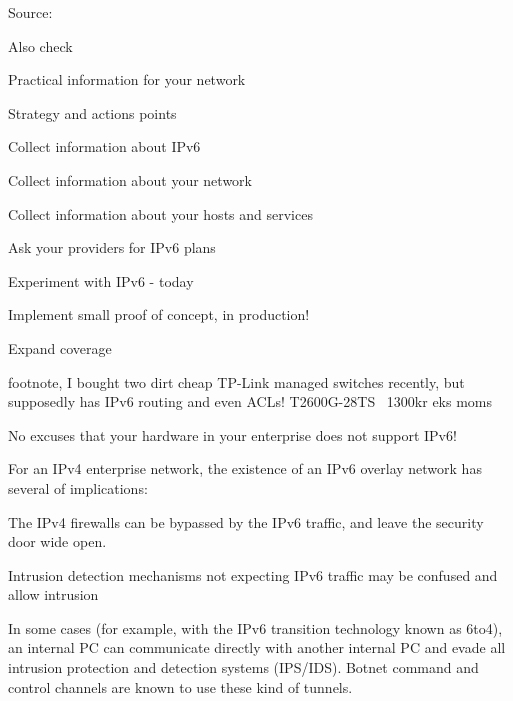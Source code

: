 \documentclass[20pt,landscape,a4paper,footrule]{foils}
\begin{document}

Source: 

Also check 

\centerline{}




Practical information for your network

\begin{list1}
\item Strategy and actions points
\begin{list2}
\item Collect information about IPv6
\item Collect information about your network
\item Collect information about your hosts and services
\item Ask your providers for IPv6 plans
\item Experiment with IPv6 - today
\item Implement small proof of concept, in production!
\item Expand coverage
\end{list2}
\end{list1}

footnote, I bought two dirt cheap TP-Link managed switches recently, but supposedly has IPv6 routing and even ACLs! T2600G-28TS ~1300kr eks moms\\ {\footnotesize{}}

No excuses that your hardware in your enterprise does not support IPv6!



\begin{list1}
\item For an IPv4 enterprise network, the existence of an IPv6 overlay network has several of implications:
\begin{list2}
\item The IPv4 firewalls can be bypassed by the IPv6 traffic, and leave the security door wide open.
\item Intrusion detection mechanisms not expecting IPv6 traffic may be confused and allow intrusion
\item In some cases (for example, with the IPv6 transition technology known as 6to4), an internal PC can communicate directly with another internal PC and evade all intrusion protection and detection systems (IPS/IDS). Botnet command and control channels are known to use these kind of tunnels.
\end{list2}
\end{list1}
\end{document}
